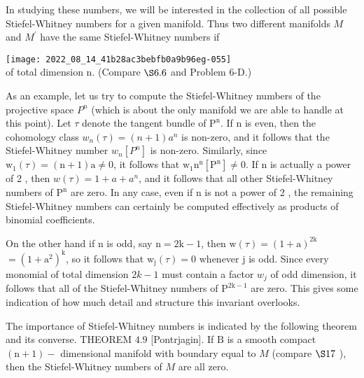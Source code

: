 \documentclass[10pt]{article}
\begin{document}
In studying these numbers, we will be interested in the collection of all possible Stiefel-Whitney numbers for a given manifold. Thus two different manifolds $M$ and $M^{\prime}$ have the same Stiefel-Whitney numbers if

\texttt{[image: 2022\_08\_14\_41b28ac3bebfb0a9b96eg-055]}\\
of total dimension $\mathrm{n}$. (Compare $\S 6.6$ and Problem 6-D.)

As an example, let us try to compute the Stiefel-Whitney numbers of the projective space $P^{n}$ (which is about the only manifold we are able to handle at this point). Let $\tau$ denote the tangent bundle of $\mathrm{P}^{\mathrm{n}}$. If $\mathrm{n}$ is even, then the cohomology class $w_{n}(\tau)=(n+1) a^{n}$ is non-zero, and it follows that the Stiefel-Whitney number $w_{n}\left[P^{n}\right]$ is non-zero. Similarly, since $\mathrm{w}_{1}(\tau)=(\mathrm{n}+1) \mathrm{a} \neq 0$, it follows that $\mathrm{w}_{1} \mathrm{n}^{\mathrm{n}}\left[\mathrm{P}^{\mathrm{n}}\right] \neq 0$. If $\mathrm{n}$ is actually a power of 2 , then $w(\tau)=1+a+a^{n}$, and it follows that all other Stiefel-Whitney numbers of $\mathrm{P}^{\mathrm{n}}$ are zero. In any case, even if $\mathrm{n}$ is not a power of 2 , the remaining Stiefel-Whitney numbers can certainly be computed effectively as products of binomial coefficients.

On the other hand if $\mathrm{n}$ is odd, say $\mathrm{n}=2 \mathrm{k}-1$, then $\mathrm{w}(\tau)=(1+\mathrm{a})^{2 \mathrm{k}}$ $=\left(1+\mathrm{a}^{2}\right)^{\mathrm{k}}$, so it follows that $\mathrm{w}_{\mathrm{j}}(\tau)=0$ whenever $\mathrm{j}$ is odd. Since every monomial of total dimension $2 k-1$ must contain a factor $w_{j}$ of odd dimension, it follows that all of the Stiefel-Whitney numbers of $\mathrm{P}^{2 \mathrm{k}-1}$ are zero. This gives some indication of how much detail and structure this invariant overlooks.

The importance of Stiefel-Whitney numbers is indicated by the following theorem and its converse. THEOREM $4.9$ [Pontrjagin]. If $\mathrm{B}$ is a smooth compact $(\mathrm{n}+1)-$ dimensional manifold with boundary equal to $M$ (compare $\S 17$ ), then the Stiefel-Whitney numbers of $M$ are all zero.
\end{document}

